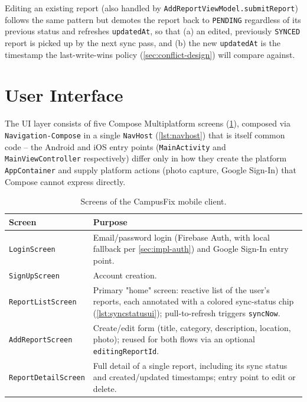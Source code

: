 Editing an existing report (also handled by
\texttt{AddReportViewModel.submitReport}) follows the same pattern but
demotes the report back to \texttt{PENDING} regardless of its previous
status and refreshes \texttt{updatedAt}, so that (a) an edited, previously
\texttt{SYNCED} report is picked up by the next sync pass, and (b) the new
\texttt{updatedAt} is the timestamp the last-write-wins policy
(\cref{sec:conflict-design}) will compare against.

\section{User Interface}
\label{sec:impl-ui}

The UI layer consists of five Compose Multiplatform screens
(\cref{tab:screens}), composed via \texttt{Navigation-Compose} in a single
\texttt{NavHost} (\cref{lst:navhost}) that is itself common code -- the
Android and iOS entry points (\texttt{MainActivity} and
\texttt{MainViewController} respectively) differ only in how they create
the platform \texttt{AppContainer} and supply platform actions (photo
capture, Google Sign-In) that Compose cannot express directly.

\begin{table}[htbp]
\centering
\caption{Screens of the CampusFix mobile client.}
\label{tab:screens}
\begin{tabularx}{\textwidth}{@{}l X@{}}
\toprule
\textbf{Screen} & \textbf{Purpose} \\
\midrule
\texttt{LoginScreen} & Email/password login (Firebase Auth, with local
fallback per \cref{sec:impl-auth}) and Google Sign-In entry point. \\
\texttt{SignUpScreen} & Account creation. \\
\texttt{ReportListScreen} & Primary "home" screen: reactive list of the
user's reports, each annotated with a colored sync-status chip
(\cref{lst:syncstatusui}); pull-to-refresh triggers \texttt{syncNow}. \\
\texttt{AddReportScreen} & Create/edit form (title, category, description,
location, photo); reused for both flows via an optional
\texttt{editingReportId}. \\
\texttt{ReportDetailScreen} & Full detail of a single report, including
its sync status and created/updated timestamps; entry point to edit or
delete. \\
\bottomrule
\end{tabularx}
\end{table}

